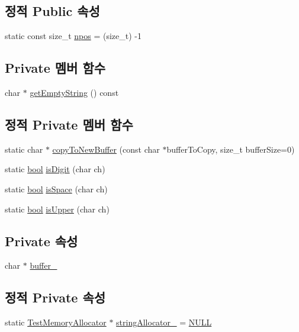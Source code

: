 \subsection*{정적 Public 속성}
\begin{DoxyCompactItemize}
\item 
static const size\+\_\+t \hyperlink{class_simple_string_a03aff983f503a71029aecb707175b2ed}{npos} = (size\+\_\+t) -\/1
\end{DoxyCompactItemize}
\subsection*{Private 멤버 함수}
\begin{DoxyCompactItemize}
\item 
char $\ast$ \hyperlink{class_simple_string_ac773de7d35d0a7340dded708cbd214b5}{get\+Empty\+String} () const 
\end{DoxyCompactItemize}
\subsection*{정적 Private 멤버 함수}
\begin{DoxyCompactItemize}
\item 
static char $\ast$ \hyperlink{class_simple_string_a794a75bc8a614c11c5ddf134944a5ab7}{copy\+To\+New\+Buffer} (const char $\ast$buffer\+To\+Copy, size\+\_\+t buffer\+Size=0)
\item 
static \hyperlink{avb__gptp_8h_af6a258d8f3ee5206d682d799316314b1}{bool} \hyperlink{class_simple_string_a57470ac813e2a048b9caa2cb52fb1915}{is\+Digit} (char ch)
\item 
static \hyperlink{avb__gptp_8h_af6a258d8f3ee5206d682d799316314b1}{bool} \hyperlink{class_simple_string_a473865ab67a00da6e835ff8fc01d2eb9}{is\+Space} (char ch)
\item 
static \hyperlink{avb__gptp_8h_af6a258d8f3ee5206d682d799316314b1}{bool} \hyperlink{class_simple_string_af0647b82c067520e5c0024f42f4c7211}{is\+Upper} (char ch)
\end{DoxyCompactItemize}
\subsection*{Private 속성}
\begin{DoxyCompactItemize}
\item 
char $\ast$ \hyperlink{class_simple_string_a37525d5cfe40669bc9ca14b3234c70d2}{buffer\+\_\+}
\end{DoxyCompactItemize}
\subsection*{정적 Private 속성}
\begin{DoxyCompactItemize}
\item 
static \hyperlink{class_test_memory_allocator}{Test\+Memory\+Allocator} $\ast$ \hyperlink{class_simple_string_aa6bb63164af4af1bf62e59b19e14d4be}{string\+Allocator\+\_\+} = \hyperlink{openavb__types__base__pub_8h_a070d2ce7b6bb7e5c05602aa8c308d0c4}{N\+U\+LL}
\end{DoxyCompactItemize}
